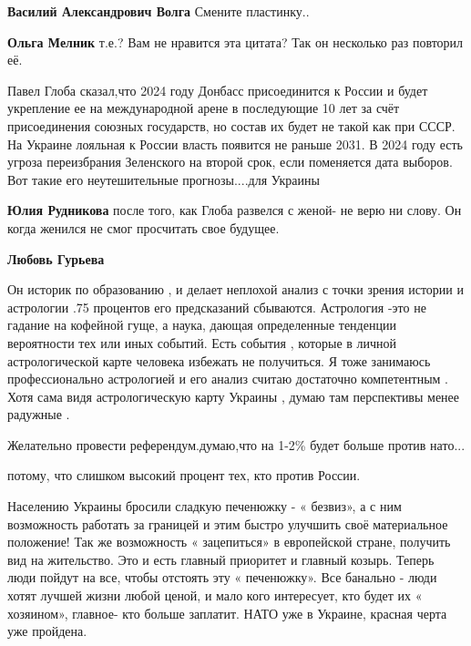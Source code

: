 \begin{itemize}
\begin{itemize}
\textbf{Василий Александрович Волга} Смените пластинку..

\textbf{Ольга Мелник} т.е.? Вам не нравится эта цитата? Так он несколько раз повторил её.
\end{itemize} %


Павел Глоба сказал,что 2024 году Донбасс присоединится к России и будет
укрепление ее на международной арене в последующие 10 лет за счёт присоединения
союзных государств, но состав их будет не такой как при СССР. На Украине
лояльная к России власть появится не раньше 2031. В 2024 году есть угроза
переизбрания Зеленского на второй срок, если поменяется дата выборов. Вот такие
его неутешительные прогнозы....для Украины

\begin{itemize} %
\textbf{Юлия Рудникова} после того, как Глоба развелся с женой- не верю ни слову. Он когда женился не смог просчитать свое будущее.

\textbf{Любовь Гурьева} 

Он историк по образованию , и делает неплохой анализ с точки зрения истории и
астрологии .75 процентов его предсказаний сбываются. Астрология -это не гадание
на кофейной гуще, а наука, дающая определенные тенденции вероятности тех или
иных событий. Есть события , которые в личной астрологической карте человека
избежать не получиться. Я тоже занимаюсь профессионально астрологией и его
анализ считаю достаточно компетентным . Хотя сама видя астрологическую карту
Украины , думаю там перспективы менее радужные .

\end{itemize} %

Желательно провести референдум.думаю,что на 1-2\% будет больше против нато...

потому, что слишком высокий процент тех, кто против России.


Населению Украины бросили сладкую печенюжку - « безвиз», а с ним возможность
работать за границей и этим быстро улучшить своё материальное положение! Так же
возможность « зацепиться» в европейской стране, получить вид на жительство. Это
и есть главный приоритет и главный козырь. Теперь люди пойдут на все, чтобы
отстоять эту « печенюжку». Все банально - люди хотят лучшей жизни любой ценой,
и мало кого интересует, кто будет их « хозяином», главное- кто больше заплатит.
НАТО уже в Украине, красная черта уже пройдена.


\end{itemize}
